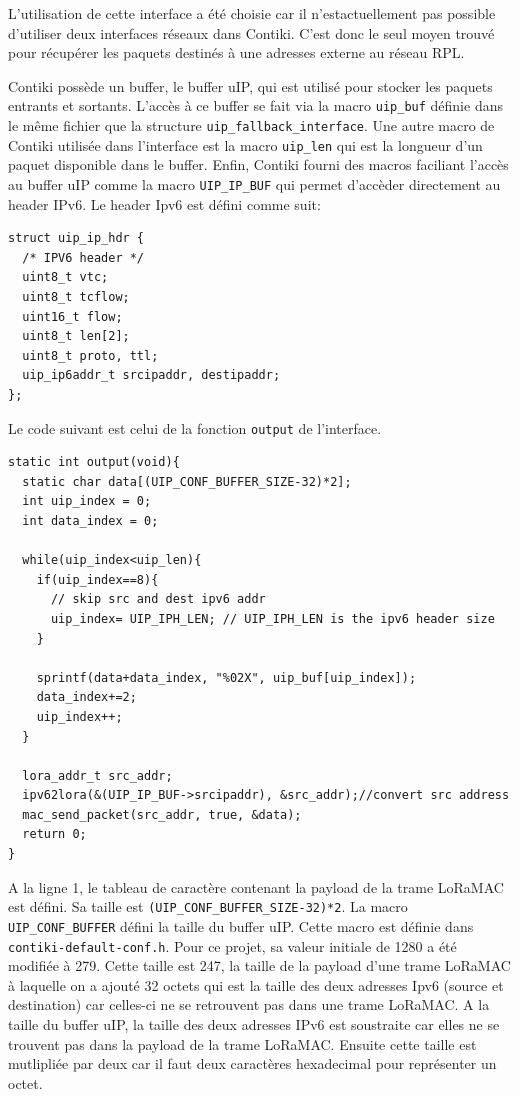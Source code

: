     L'utilisation de cette interface a été choisie car il n'estactuellement pas possible d'utiliser deux interfaces réseaux dans Contiki. C'est donc le seul moyen trouvé pour récupérer les paquets destinés à une adresses externe au réseau RPL.

    Contiki possède un buffer, le buffer uIP, qui est utilisé pour stocker les paquets entrants et sortants.
    L'accès à ce buffer se fait via la macro \texttt{uip\_buf} définie dans le même fichier que la structure \texttt{uip\_fallback\_interface}. Une autre macro de Contiki utilisée dans l'interface est la macro \texttt{uip\_len} qui est la longueur d'un paquet disponible dans le buffer. Enfin, Contiki fourni des macros faciliant l'accès au buffer uIP comme la macro \texttt{UIP\_IP\_BUF} qui permet d'accèder directement au header IPv6. Le header Ipv6 est défini comme suit:
    \begin{verbatim}
struct uip_ip_hdr {
  /* IPV6 header */
  uint8_t vtc;
  uint8_t tcflow;
  uint16_t flow;
  uint8_t len[2];
  uint8_t proto, ttl;
  uip_ip6addr_t srcipaddr, destipaddr;
};
    \end{verbatim}

    Le code suivant est celui de la fonction \texttt{output} de l'interface.

    \begin{verbatim}
static int output(void){ 
  static char data[(UIP_CONF_BUFFER_SIZE-32)*2];
  int uip_index = 0;
  int data_index = 0;
  
  while(uip_index<uip_len){
    if(uip_index==8){
      // skip src and dest ipv6 addr
      uip_index= UIP_IPH_LEN; // UIP_IPH_LEN is the ipv6 header size
    }

    sprintf(data+data_index, "%02X", uip_buf[uip_index]);
    data_index+=2;
    uip_index++;
  }

  lora_addr_t src_addr;
  ipv62lora(&(UIP_IP_BUF->srcipaddr), &src_addr);//convert src address
  mac_send_packet(src_addr, true, &data);
  return 0;
}
    \end{verbatim}
    A la ligne 1, le tableau de caractère contenant la payload de la trame LoRaMAC est défini. Sa 
    taille est \texttt{(UIP\_CONF\_BUFFER\_SIZE-32)*2}. La macro \texttt{UIP\_CONF\_BUFFER} défini 
    la taille du buffer uIP. Cette macro est définie dans \texttt{contiki-default-conf.h}. Pour ce 
    projet, sa valeur initiale de 1280 a été modifiée à 279. Cette taille est 247, la 
    taille de la payload d'une trame LoRaMAC à laquelle on a ajouté 32 octets qui est la taille des 
    deux adresses Ipv6 (source et destination) car celles-ci ne se retrouvent pas dans une trame LoRaMAC.
    A la taille du buffer uIP, la taille des deux adresses IPv6 est soustraite car elles ne se 
    trouvent pas dans la payload de la trame LoRaMAC. Ensuite cette taille est mutlipliée par deux 
    car il faut deux caractères hexadecimal pour représenter un octet.


